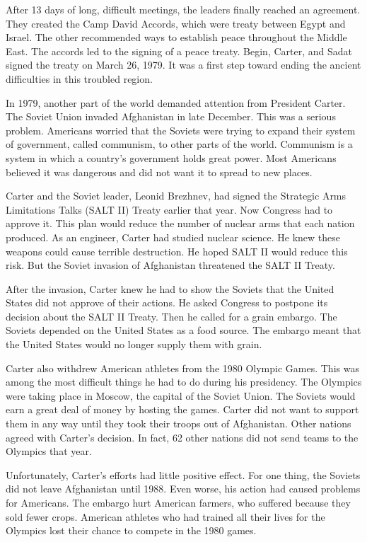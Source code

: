 \documentclass{article}
\begin{document}
After 13 days of long, difficult meetings, the leaders finally reached an agreement. They created the Camp David Accords, which were treaty between Egypt and Israel. The other recommended ways to establish peace throughout the Middle East. The accords led to the signing of a peace treaty. Begin, Carter, and Sadat signed the treaty on March 26, 1979. It was a first step toward ending the ancient difficulties in this troubled region.

In 1979, another part of the world demanded attention from President Carter. The Soviet Union invaded Afghanistan in late December. This was a serious problem. Americans worried that the Soviets were trying to expand their system of government, called communism, to other parts of the world. Communism is a system in which a country's government holds great power. Most Americans believed it was dangerous and did not want it to spread to new places.

Carter and the Soviet leader, Leonid Brezhnev, had signed the Strategic Arms Limitations Talks (SALT II) Treaty earlier that year. Now Congress had to approve it. This plan would reduce the number of nuclear arms that each nation produced. As an engineer, Carter had studied nuclear science. He knew these weapons could cause terrible destruction. He hoped SALT II would reduce this risk. But the Soviet invasion of Afghanistan threatened the SALT II Treaty.

After the invasion, Carter knew he had to show the Soviets that the United States did not approve of their actions. He asked Congress to postpone its decision about the SALT II Treaty. Then he called for a grain embargo. The Soviets depended on the United States as a food source. The embargo meant that the United States would no longer supply them with grain.

Carter also withdrew American athletes from the 1980 Olympic Games. This was among the most difficult things he had to do during his presidency. The Olympics were taking place in Moscow, the capital of the Soviet Union. The Soviets would earn a great deal of money by hosting the games. Carter did not want to support them in any way until they took their troops out of Afghanistan. Other nations agreed with Carter's decision. In fact, 62 other nations did not send teams to the Olympics that year.

Unfortunately, Carter's efforts had little positive effect. For one thing, the Soviets did not leave Afghanistan until 1988. Even worse, his action had caused problems for Americans. The embargo hurt American farmers, who suffered because they sold fewer crops. American athletes who had trained all their lives for the Olympics lost their chance to compete in the 1980 games.
\end{document}

